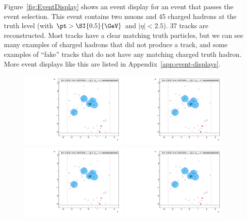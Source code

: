 Figure~\ref{fig:EventDisplay} shows an event display for an event that passes the event selection. This event contains two muons and 45 charged hadrons at the truth level (with $\pt>\SI{0.5}{\GeV}$ and $|\eta|<2.5$). 37 tracks are reconstructed. Most tracks have a clear matching truth particles, but we can see many examples of charged hadrons that did not produce a track, and some examples of ``fake'' tracks that do not have any matching charged truth hadron. More event displays like this are listed in Appendix~\ref{app:event-displays}.

\begin{figure}[h!]
  \centering
  \includegraphics[page=26,width=0.48\textwidth]{figures/EventDisplays.pdf}
  \includegraphics[page=27,width=0.48\textwidth]{figures/EventDisplays.pdf} \\
  \includegraphics[page=29,width=0.48\textwidth]{figures/EventDisplays.pdf}
  \includegraphics[page=30,width=0.48\textwidth]{figures/EventDisplays.pdf}

\end{figure}
